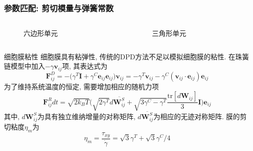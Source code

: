 

\begin{frame}
\frametitle{参数匹配: 剪切模量与弹簧常数}
\note{\textcolor{red}{375-390s}}
\begin{columns}
\begin{column}[c]{0.5\textwidth}
\begin{figure}[!htb]
\centering

\caption{\label{fig:network2continuum} 六边形单元}
\end{figure}
\end{column}
\begin{column}[c]{0.5\textwidth}
\begin{figure}[!htb]
\centering

\vspace{-2em}
\caption{\label{fig:network2continuum} 三角形单元}
\end{figure}
\end{column}
\end{columns}
\end{frame}


\begin{frame}{细胞膜粘性}
细胞膜具有粘弹性, 传统的DPD方法不足以模拟细胞膜的粘性. 在珠簧链模型中加入$-\gamma \mathbf{v}_{ij}$项, 其表达式为
\[
\mathbf{F}_{ij}^D = 
-\bigg(
\gamma^T\mathbf{I} + \gamma^C \mathbf{e}_{ij}\mathbf{e}_{ij}
\bigg)\mathbf{v}_{ij}
=-\gamma^T\mathbf{v}_{ij} -\gamma^C(\mathbf{v}_{ij}\cdot \mathbf{e}_{ij}) \mathbf{e}_{ij}
\]
为了维持系统温度的恒定, 需要增加相应的随机力项
\[
\mathbf{F}^R_{ij} dt = \sqrt{2k_BT}
\bigg(
\sqrt{2 \gamma^T} d\overline{\mathbf{W}_{ij}^S} + \sqrt{3\gamma^C-\gamma^T}\frac{\mathrm{tr}[d\mathbf{W}_{ij}]}{3}\mathbf{I}\bigg)\mathbf{e}_{ij}
\]
其中, $d\mathbf{W}_{ij}^S$为具有独立维纳增量的对称矩阵,  $d\overline{\mathbf{W}_{ij}^S}$为相应的无迹对称矩阵. 膜的剪切粘度$\eta_m$为
\[
\eta_m=\frac{\tau_{xy}}{\dot{\gamma}} = \sqrt{3}\gamma^T+ \sqrt{3}\gamma^C/4
\]
\end{frame}

